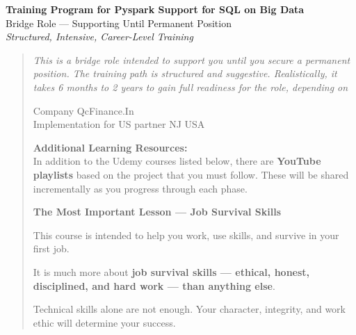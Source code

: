 \documentclass[12pt]{article}
\begin{document}
	
	\begin{center}
		{\Huge\bfseries Training Program for Pyspark Support for SQL on Big Data} \\[0.5cm]
		{\large Bridge Role — Supporting Until Permanent Position} \\[0.3cm]
		{\textit{Structured, Intensive, Career-Level Training}} \\[1cm]
	\end{center}
	
	\begin{quote}
		\emph{This is a bridge role intended to support you until you secure a permanent position. The training path is structured and suggestive. Realistically, it takes 6 months to 2 years to gain full readiness for the role, depending on}
		
		\vspace{0.3cm}
		
		Company QcFinance.In \\
		Implementation for US partner NJ USA
		
		\vspace{0.3cm}
		
		\textbf{Additional Learning Resources:} \\
		In addition to the Udemy courses listed below, there are \textbf{YouTube playlists} based on the project that you must follow. These will be shared incrementally as you progress through each phase.
		
		\vspace{0.3cm}
		
		\Large\textbf{The Most Important Lesson — Job Survival Skills}
		
		\vspace{0.3cm}
		
		This course is intended to help you work, use skills, and survive in your first job.
		
		It is much more about \textbf{job survival skills — ethical, honest, disciplined, and hard work — than anything else}.
		
		\vspace{0.2cm}
		\noindent Technical skills alone are not enough. Your character, integrity, and work ethic will determine your success.
		

\end{quote}
\end{document}
